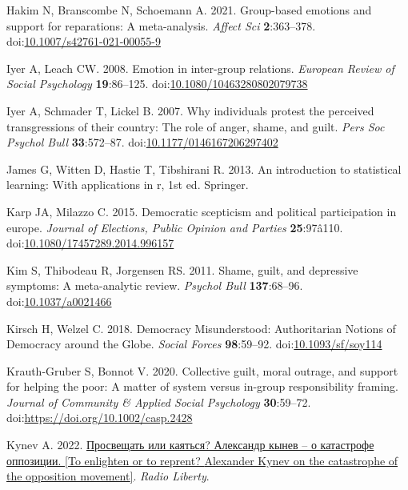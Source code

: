 \documentclass[
]{article}
\newlength{\cslhangindent}
\newenvironment{CSLReferences}[2] %
 {\begin{list}{}{%
  \setlength{\itemindent}{0pt}
  \setlength{\leftmargin}{0pt}
  \setlength{\parsep}{0pt}
  \ifodd #1
   \setlength{\leftmargin}{\cslhangindent}
   \setlength{\itemindent}{-1\cslhangindent}
  \fi
  \setlength{\itemsep}{#2\baselineskip}}}
 {\end{list}}
\begin{document}
\begin{CSLReferences}{1}{0}
Hakim N, Branscombe N, Schoemann A. 2021. Group-based emotions and support for reparations: A meta-analysis. \emph{Affect Sci} \textbf{2}:363--378. doi:\href{https://doi.org/10.1007/s42761-021-00055-9}{10.1007/s42761-021-00055-9}

Iyer A, Leach CW. 2008. Emotion in inter-group relations. \emph{European Review of Social Psychology} \textbf{19}:86--125. doi:\href{https://doi.org/10.1080/10463280802079738}{10.1080/10463280802079738}

Iyer A, Schmader T, Lickel B. 2007. Why individuals protest the perceived transgressions of their country: The role of anger, shame, and guilt. \emph{Pers Soc Psychol Bull} \textbf{33}:572--87. doi:\href{https://doi.org/10.1177/0146167206297402}{10.1177/0146167206297402}

James G, Witten D, Hastie T, Tibshirani R. 2013. An introduction to statistical learning: With applications in r, 1st ed. Springer.

Karp JA, Milazzo C. 2015. Democratic scepticism and political participation in europe. \emph{Journal of Elections, Public Opinion and Parties} \textbf{25}:97â110. doi:\href{https://doi.org/10.1080/17457289.2014.996157}{10.1080/17457289.2014.996157}

Kim S, Thibodeau R, Jorgensen RS. 2011. Shame, guilt, and depressive symptoms: A meta-analytic review. \emph{Psychol Bull} \textbf{137}:68--96. doi:\href{https://doi.org/10.1037/a0021466}{10.1037/a0021466}

Kirsch H, Welzel C. 2018. {Democracy Misunderstood: Authoritarian Notions of Democracy around the Globe}. \emph{Social Forces} \textbf{98}:59--92. doi:\href{https://doi.org/10.1093/sf/soy114}{10.1093/sf/soy114}

Krauth-Gruber S, Bonnot V. 2020. Collective guilt, moral outrage, and support for helping the poor: A matter of system versus in-group responsibility framing. \emph{Journal of Community \& Applied Social Psychology} \textbf{30}:59--72. doi:\url{https://doi.org/10.1002/casp.2428}

Kynev A. 2022. \href{https://www.svoboda.org/a/prosveschatj-ili-kayatjsya-aleksandr-kynev-o-katastrofe-oppozitsii/31792631.html}{Просвещать или каяться? Александр кынев -- о катастрофе оппозиции. {[}To enlighten or to reprent? {Alexander Kynev} on the catastrophe of the opposition movement{]}}. \emph{Radio Liberty}.


\end{CSLReferences}
\end{document}
